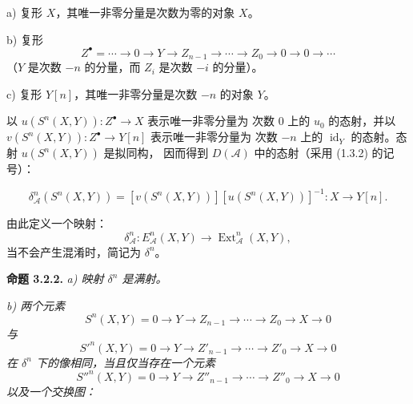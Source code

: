 \clearpage
{}%
\begingroup\small\setlength{\parskip}{0pt}\setlength{\emergencystretch}{1.5em}
\setlength{\abovedisplayskip}{4pt plus 2pt minus 2pt}%
\setlength{\belowdisplayskip}{4pt plus 2pt minus 2pt}%

\noindent a) 复形 $X$，其唯一非零分量是次数为零的对象 $X$。

\noindent b) 复形
\[
Z^\bullet=\cdots\longrightarrow0\longrightarrow Y
\longrightarrow Z_{n-1}\longrightarrow\cdots\longrightarrow Z_0
\longrightarrow0\longrightarrow0\longrightarrow\cdots
\]
（$Y$ 是次数 $-n$ 的分量，而 $Z_i$ 是次数 $-i$ 的分量）。

\noindent c) 复形 $Y[n]$，其唯一非零分量是次数 $-n$ 的对象 $Y$。

以 $u(S^n(X,Y))\colon Z^\bullet\longrightarrow X$ 表示唯一非零分量为
次数 $0$ 上的 $u_0$ 的态射，并以
$v(S^n(X,Y))\colon Z^\bullet\longrightarrow Y[n]$ 表示唯一非零分量为
次数 $-n$ 上的 $\operatorname{id}_Y$ 的态射。态射 $u(S^n(X,Y))$ 是拟同构，
因而得到 $D(\mathcal A)$ 中的态射（采用 (1.3.2) 的记号）：

\begin{equation}
\delta_{\mathcal A}^{n}(S^n(X,Y))=
[v(S^n(X,Y))][u(S^n(X,Y))]^{-1}\colon X\longrightarrow Y[n].
\tag{3.2.1.1}
\end{equation}

由此定义一个映射：
\begin{equation}
\delta_{\mathcal A}^{n}\colon E_{\mathcal A}^{n}(X,Y)
\longrightarrow\operatorname{Ext}_{\mathcal A}^{n}(X,Y),
\tag{3.2.1.2}
\end{equation}
当不会产生混淆时，简记为 $\delta^n$。

\medskip\noindent\textbf{命题 3.2.2.}\quad
\textit{a) 映射 $\delta^n$ 是满射。}

\noindent\textit{b) 两个元素}
\[
S^n(X,Y)=0\longrightarrow Y\longrightarrow Z_{n-1}
\longrightarrow\cdots\longrightarrow Z_0\longrightarrow X
\longrightarrow0
\]
\noindent\textit{与}
\[
{S'}^n(X,Y)=0\longrightarrow Y\longrightarrow Z'_{n-1}
\longrightarrow\cdots\longrightarrow Z'_0\longrightarrow X
\longrightarrow0
\]
\noindent\textit{在 $\delta^n$ 下的像相同，当且仅当存在一个元素}
\[
{S''}^n(X,Y)=0\longrightarrow Y\longrightarrow Z''_{n-1}
\longrightarrow\cdots\longrightarrow Z''_0\longrightarrow X
\longrightarrow0
\]
\noindent\textit{以及一个交换图：}

